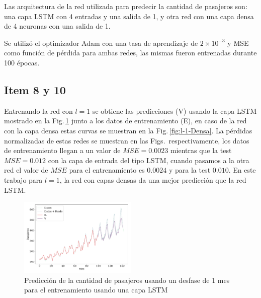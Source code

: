 Las arquitectura de la red utilizada para predecir la cantidad de pasajeros son:  una capa LSTM con 4 entradas y una salida de 1, y otra red con una capa densa de 4 neuronas con una salida de 1.

Se utilizó el optimizador Adam con una tasa de aprendizaje de $2\times10^{-3}$ y MSE como función de pérdida para ambas redes, las mismas fueron entrenadas durante 100 épocas.

\subsection*{Item 8 y 10}

Entrenando la red con $l=1$ se obtiene las predicciones (V) usando la capa LSTM mostrado en la Fig.\,\ref{fig:l-1-LSTM} junto a los datos de entrenamiento (E), en caso de la red con la capa densa estas curvas se muestran en la Fig.\,\ref{fig:l-1-Densa}. La pérdidas normalizadas de estas redes se muestran en las Figs.\, respectivamente, los datos de entrenamiento llegan a un valor de $MSE=0.0023$ mientras que la test $MSE=0.012$ con la capa de entrada del tipo LSTM, cuando pasamos a la otra red el valor de $MSE$ para el  entrenamiento es $0.0024$ y para la test $0.010$. En este trabajo para $l=1$, la red con capas densas da una mejor predicción que la red LSTM.

\begin{figure}[H]
	\begin{small}
		\begin{center}
			\includegraphics[width=0.5\textwidth]{prediccion_l-1.pdf}
		\end{center}
		\caption{Predicción de la cantidad de pasajeros usando un desfase de 1 mes para el entrenamiento usando una capa LSTM}
		\label{fig:l-1-LSTM}
	\end{small}
\end{figure}


